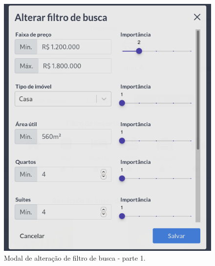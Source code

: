 \begin{figure}[H]
    \centering
    \includegraphics[scale=0.45]{figuras/desenvolvimento/componente_filtro3.png}
    \caption[Modal de alteração de filtro de busca - parte 1]{Modal de alteração de filtro de busca - parte 1.}
    \label{fig:componente_filtro3}
\end{figure}

